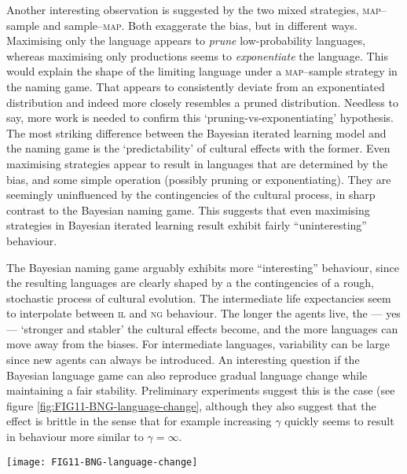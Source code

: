 \documentclass{../src/bcthesispart}
\begin{document}
Another interesting observation is suggested by the two mixed strategies, \textsc{map}--sample and sample--\textsc{map}.
Both exaggerate the bias, but in different ways.
Maximising only the language appears to \emph{prune} low-probability languages, whereas maximising only productions seems to \emph{exponentiate} the language.
This would explain the shape of the limiting language under a \textsc{map}--sample strategy in the naming game.
That appears to consistently deviate from an exponentiated distribution and indeed more closely resembles a pruned distribution.
Needless to say, more work is needed to confirm this ‘pruning-vs-exponentiating’ hypothesis.
The most striking difference between the Bayesian iterated learning model and the naming game is the ‘predictability’ of cultural effects with the former.
Even maximising strategies appear to result in languages that are determined by the bias, and some simple operation (possibly pruning or exponentiating).
They are seemingly uninfluenced by the contingencies of the cultural process, in sharp contrast to the Bayesian naming game.
This suggests that even maximising strategies in Bayesian iterated learning result exhibit fairly “uninteresting” \parencite[cf.][]{Dediu2009} behaviour.





The Bayesian naming game arguably exhibits more “interesting” behaviour, since the resulting languages are clearly shaped by a the contingencies of a rough, stochastic process of cultural evolution.
The intermediate life expectancies seem to interpolate between \textsc{il} and \textsc{ng} behaviour.
The longer the agents live, the — yes — ‘stronger and stabler’ the cultural effects become, and the more languages can move away from the biases.
For intermediate languages, variability can be large since new agents can always be introduced.
An interesting question if the Bayesian language game can also reproduce gradual language change while maintaining a fair stability.
Preliminary experiments suggest this is the case (see figure \ref{fig:FIG11-BNG-language-change}, although they also suggest that the effect is brittle in the sense that for example increasing $\gamma$ quickly seems to result in behaviour more similar to $\gamma=\infty$.




\begin{SCfigure}
	\texttt{[image: FIG11-BNG-language-change]}
	
	\caption{%
	Gradual language change in the Bayesian language game for a particular choice of parameters.
	The effect seems brittle: slightly different parameter settings can give the kind of behaviour shown when $\gamma=\infty$.
	\label{fig:FIG11-BNG-language-change}}
\end{SCfigure}
\end{document}
